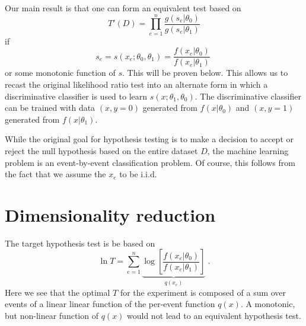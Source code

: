 \documentclass[11pt, oneside]{article}   	%
\begin{document}
Our main result is that one can form an equivalent test based on 
\begin{equation}
T'(D) = \prod_{e=1}^n \frac{ g(s_e | \theta_0)}{ g(s_e | \theta_1)}
\end{equation}
if 
\begin{equation}
s_e = s(x_e; \theta_0, \theta_1) = \frac{ f(x_e|\theta_0)}{ f(x_e|\theta_1)} \; 
\end{equation}
or some monotonic function of $s$. This will be proven below.
This allows us to recast the original likelihood ratio test into an alternate form in which a discriminative classifier is 
used to learn $s(x; \theta_1, \theta_0)$. The discriminative classifier can be trained with data $(x,y=0)$ generated 
from $f(x|\theta_0)$ and $(x,y=1)$ generated from $f(x|\theta_1)$.

While the original goal for hypothesis testing is to make a decision to accept or reject the null hypothesis based on the entire dataset $D$, the machine learning problem is an event-by-event classification problem. Of course, this follows from the fact that we assume the $x_e$ to be i.i.d.

\section{Dimensionality reduction}


 The target hypothesis test is be based on 
\begin{equation}
\ln T =   \sum_{e=1}^n \underbrace{\log \left[ \frac {f(x_e | \theta_0) }{ f(x_e | \theta_1) } \right]}_{q(x_e)} \;.
\end{equation}
Here we see that the optimal $T$ for the experiment is composed of a sum over events of a linear linear function of the per-event function $q(x)$. A monotonic, but non-linear function of $q(x)$ would not lead to an equivalent hypothesis test. 
\end{document}
